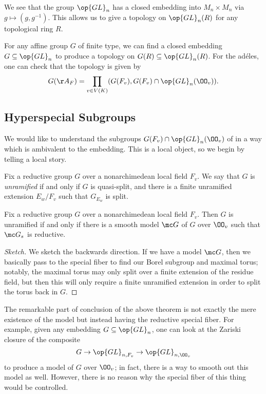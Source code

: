 \documentclass{article}
\begin{document}
\begin{example}
	We see that the group $\op{GL}_n$ has a closed embedding into $M_n\times M_n$ via $g\mapsto\left(g,g^{-1}\right)$. This allows us to give a topology on $\op{GL}_n(R)$ for any topological ring $R$.
\end{example}
\begin{example} \label{ex:topology-on-g-adeles}
	For any affine group $G$ of finite type, we can find a closed embedding $G\subseteq\op{GL}_n$ to produce a topology on $G(R)\subseteq\op{GL}_n(R)$. For the ad\'eles, one can check that the topology is given by
	\[G(\AA_F)=\prod_{v\in V(K)}(G(F_v),G(F_v)\cap\op{GL}_n(\OO_v)).\]
\end{example}

\subsection{Hyperspecial Subgroups}
We would like to understand the subgroups $G(F_v)\cap\op{GL}_n(\OO_v)$ of  in a way which is ambivalent to the embedding. This is a local object, so we begin by telling a local story.
\begin{definition}[unramified]
	Fix a reductive group $G$ over a nonarchimedean local field $F_v$. We say that $G$ is \textit{unramified} if and only if $G$ is quasi-split, and there is a finite unramified extension $E_w/F_v$ such that $G_{E_w}$ is split.
\end{definition}
\begin{theorem}
	Fix a reductive group $G$ over a nonarchimedean local field $F_v$. Then $G$ is unramified if and only if there is a smooth model $\mc G$ of $G$ over $\OO_v$ such that $\mc G_s$ is reductive.
\end{theorem}
\begin{proof}[Sketch]
	We sketch the backwards direction. If we have a model $\mc G$, then we basically pass to the special fiber to find our Borel subgroup and maximal torus; notably, the maximal torus may only split over a finite extension of the residue field, but then this will only require a finite unramified extension in order to split the torus back in $G$.
\end{proof}
The remarkable part of conclusion of the above theorem is not exactly the mere existence of the model but instead having the reductive special fiber. For example, given any embedding $G\subseteq\op{GL}_n$, one can look at the Zariski closure of the composite
\[G\to{\op{GL}_{n,F_v}}\to{\op{GL}_{n,\OO_v}}\]
to produce a model of $G$ over $\OO_v$; in fact, there is a way to smooth out this model as well. However, there is no reason why the special fiber of this thing would be controlled.
\end{document}
